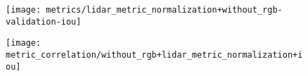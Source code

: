 \begin{figure}[H]
  \centering
  \texttt{[image: metrics/lidar\_metric\_normalization+without\_rgb-validation-iou]}
\end{figure}

\begin{figure}[H]
  \centering
  \texttt{[image: metric\_correlation/without\_rgb+lidar\_metric\_normalization+iou]}
\end{figure}
